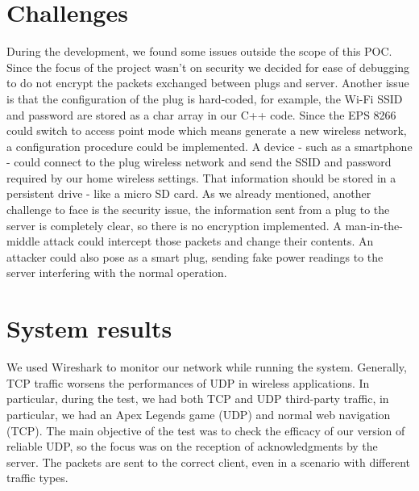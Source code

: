 \documentclass[conference]{IEEEtran}
\begin{document}
	\section{Challenges}
	During the development, we found some issues outside the scope of this POC. Since the focus of the project wasn't on security we decided for ease of debugging to do not encrypt the packets exchanged between plugs and server. Another issue is that the configuration of the plug is hard-coded, for example, the Wi-Fi SSID and password are stored as a char array in our C++ code. Since the EPS 8266 could switch to access point mode which means generate a new wireless network, a configuration procedure could be implemented. A device - such as a smartphone - could connect to the plug wireless network and send the SSID and password required by our home wireless settings. That information should be stored in a persistent drive - like a micro SD card.
	As we already mentioned, another challenge to face is the security issue, the information sent from a plug to the server is completely clear, so there is no encryption implemented. A man-in-the-middle attack could intercept those packets and change their contents. An attacker could also pose as a smart plug, sending fake power readings to the server interfering with the normal operation.
	
	\section{System results}
	We used Wireshark to monitor our network while running the system. Generally, TCP traffic worsens the performances of UDP in wireless applications. In particular, during the test, we had both TCP and UDP third-party traffic, in particular, we had an Apex Legends game (UDP) and normal web navigation (TCP). The main objective of the test was to check the efficacy of our version of reliable UDP, so the focus was on the reception of acknowledgments by the server. The packets are sent to the correct client, even in a scenario with different traffic types.
	
\end{document}
